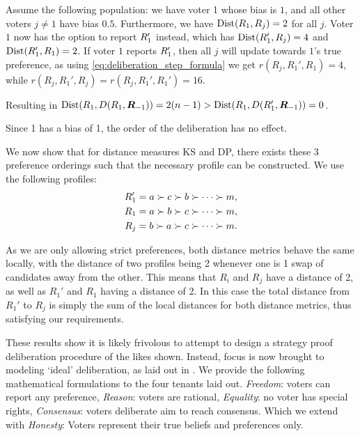 \begin{proofc} Assume the following population: we
	have voter 1 whose bias is $1$, and all other voters $j \neq 1$
	have bias $0.5$. Furthermore, we have
	$\operatorname{Dist}(R_1, R_j) = 2$ for all
	$j$. Voter $1$ now has the option to report $R_{1}'$
	instead, which has $\operatorname{Dist}(R_{1}',
		R_j) = 4$ and $\operatorname{Dist}(R_{1}',
		R_1) = 2$. If voter $1$ reports $R_1'$,
	then all $j$ will update towards $1$'s true preference, as
	using \cref{eq:deliberation_step_formula} we get $r(R_{j},
		R_{1}', R_1) = 4$, while $r(R_{j}, R_{1}', R_j) = r(R_{j},
		R_{1}', R_1') = 16$.

	Resulting in $\operatorname{Dist}(R_{1},
		D(R_{1},\boldsymbol{R}_{-1})) = 2(n-1) >
		\operatorname{Dist}(R_{1}, D(R_{1}', \boldsymbol{R}_{-1})) =
		0$.

	Since 1 has a bias of 1, the order of the deliberation has no
	effect.

	We now show that for distance measures KS and DP, there exists
	these 3 preference orderings such that the necessary profile
	can be constructed. We use the following profiles: \[
		\begin{aligned} R_{1}' & = a \succ c \succ b \succ
                \cdots \succ m,                    \\ R_{1}  & = a \succ b \succ c
                \succ \cdots \succ m,              \\ R_{j}  & = b \succ a \succ c
                \succ \cdots \succ m.              \\\end{aligned} \]

	As we are only allowing strict preferences, both distance metrics
	behave the same locally, with the distance of two profiles being 2 whenever one
	is 1 swap of candidates away from the other. This means that  \(R_{i}\) and
	\(R_{j}\) have a distance of 2, as well as  \(R_{1}'\) and \(R_{1}\) having a
	distance of 2. In this case the total distance from \(R_{1}'\) to \(R_{j}\) is
	simply the sum of the local distances for both distance metrics, thus
	satisfying our requirements.\hfill \end{proofc}


These results show it is likely frivolous to attempt to design a strategy proof
deliberation procedure of the likes shown. Instead, focus is now brought to
modeling `ideal' deliberation, as laid out in .
We provide the following mathematical formulations to the four tenants laid
out. \emph{Freedom}: voters can report any preference, \emph{Reason}: voters
are rational, \emph{Equality}: no voter has special rights, \emph{Consensus}:
voters deliberate aim to reach consensus. Which we extend with \emph{Honesty}:
Voters represent their true beliefs and preferences only.


